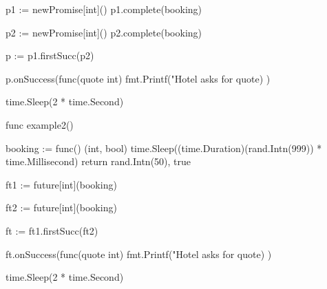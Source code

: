 \documentclass[landscape, a4paper]{article}
\begin{document}
\begin{minipage}[t]{0.2\linewidth}
\begin{betterlist}
{\begin{dnumberedcodebox}[minted language=go,minted options={autogobble, fontsize=\tiny,numbersep=0.3cm,linenos}, box align=top]
{            p1 := newPromise[int]()
            p1.complete(booking)

            p2 := newPromise[int]()
            p2.complete(booking)

            p := p1.firstSucc(p2)

            p.onSuccess(func(quote int) {
                fmt.Printf("Hotel asks for %
                  quote)
            })

            time.Sleep(2 * time.Second)
        }

        func example2() {
            booking := func() (int, bool) {
                time.Sleep((time.Duration)(rand.Intn(999)) 
                  * time.Millisecond)
                return rand.Intn(50), true
            }

            ft1 := future[int](booking)

            ft2 := future[int](booking)

            ft := ft1.firstSucc(ft2)

            ft.onSuccess(func(quote int) {
                fmt.Printf("Hotel asks for %
                  quote)
            })

            time.Sleep(2 * time.Second)
        }
        \end{dnumberedcodebox}
    }
  \end{betterlist}
\end{minipage}
\end{document}
